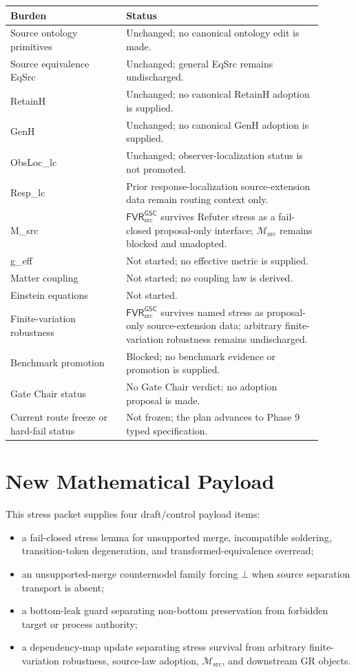 \documentclass[11pt]{article}
\newcommand{\Msrc}{\mathcal{M}_{\mathrm{src}}}
\newcommand{\FVR}{\mathsf{FVR}_{\mathrm{src}}^{\mathsf{GSC}}}
\newcommand{\Bot}{\bot}
\begin{document}
\begin{center}
\begin{tabular}{p{0.33\linewidth}p{0.57\linewidth}}
\hline
Burden & Status \\
\hline
Source ontology primitives & Unchanged; no canonical ontology edit is made. \\
Source equivalence EqSrc & Unchanged; general EqSrc remains undischarged. \\
RetainH & Unchanged; no canonical RetainH adoption is supplied. \\
GenH & Unchanged; no canonical GenH adoption is supplied. \\
ObsLoc\_lc & Unchanged; observer-localization status is not promoted. \\
Resp\_lc & Prior response-localization source-extension data remain routing context only. \\
M\_src & \(\FVR\) survives Refuter stress as a fail-closed proposal-only interface; \(\Msrc\) remains blocked and unadopted. \\
g\_eff & Not started; no effective metric is supplied. \\
Matter coupling & Not started; no coupling law is derived. \\
Einstein equations & Not started. \\
Finite-variation robustness & \(\FVR\) survives named stress as proposal-only source-extension data; arbitrary finite-variation robustness remains undischarged. \\
Benchmark promotion & Blocked; no benchmark evidence or promotion is supplied. \\
Gate Chair status & No Gate Chair verdict; no adoption proposal is made. \\
Current route freeze or hard-fail status & Not frozen; the plan advances to Phase 9 typed specification. \\
\hline
\end{tabular}
\end{center}

\section{New Mathematical Payload}

This stress packet supplies four draft/control payload items:
\begin{itemize}
  \item a fail-closed stress lemma for unsupported merge, incompatible
        soldering, transition-token degeneration, and transformed-equivalence
        overread;
  \item an unsupported-merge countermodel family forcing \(\Bot\) when source
        separation transport is absent;
  \item a bottom-leak guard separating non-bottom preservation from forbidden
        target or process authority;
  \item a dependency-map update separating stress survival from arbitrary
        finite-variation robustness, source-law adoption, \(\Msrc\), and
        downstream GR objects.
\end{itemize}
\end{document}

